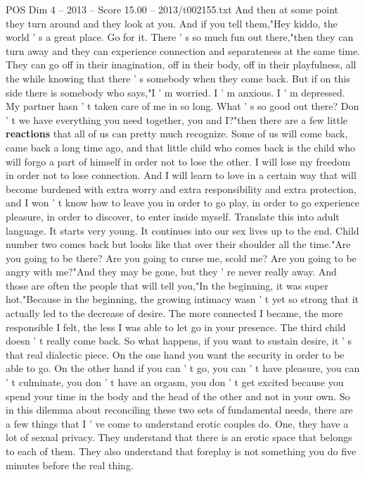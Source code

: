 \begin{textsample}{POS Dim 4 – 2013 – Score 15.00 – 2013/t002155.txt}
And then at some point they turn around and they look at you.
And if you tell them,"Hey kiddo, the world ' s a great place.
Go for it.
There ' s so much fun out there,"then they can turn away and they can experience connection and separateness at the same time.
They can go off in their imagination, off in their body, off in their playfulness, all the while knowing that there ' s somebody when they come back.
But if on this side there is somebody who says,"I ' m worried.
I ' m anxious.
I ' m depressed.
My partner hasn ' t taken care of me in so long.
What ' s so good out there?
Don ' t we have everything you need together, you and I?"then there are a few little \textbf{reactions} that all of us can pretty much recognize.
Some of us will come back, came back a long time ago, and that little child who comes back is the child who will forgo a part of himself in order not to lose the other.
I will lose my freedom in order not to lose connection.
And I will learn to love in a certain way that will become burdened with extra worry and extra responsibility and extra protection, and I won ' t know how to leave you in order to go play, in order to go experience pleasure, in order to discover, to enter inside myself.
Translate this into adult language.
It starts very young.
It continues into our sex lives up to the end.
Child number two comes back but looks like that over their shoulder all the time."Are you going to be there?
Are you going to curse me, scold me?
Are you going to be angry with me?"And they may be gone, but they ' re never really away.
And those are often the people that will tell you,"In the beginning, it was super hot."Because in the beginning, the growing intimacy wasn ' t yet so strong that it actually led to the decrease of desire.
The more connected I became, the more responsible I felt, the less I was able to let go in your presence.
The third child doesn ' t really come back.
So what happens, if you want to sustain desire, it ' s that real dialectic piece.
On the one hand you want the security in order to be able to go.
On the other hand if you can ' t go, you can ' t have pleasure, you can ' t culminate, you don ' t have an orgasm, you don ' t get excited because you spend your time in the body and the head of the other and not in your own.
So in this dilemma about reconciling these two sets of fundamental needs, there are a few things that I ' ve come to understand erotic couples do.
One, they have a lot of sexual privacy.
They understand that there is an erotic space that belongs to each of them.
They also understand that foreplay is not something you do five minutes before the real thing.

\end{textsample}
